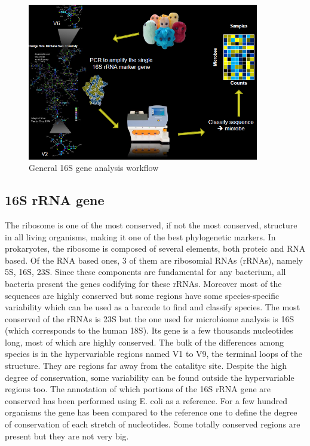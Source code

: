     \begin{figure}[H]
      \centering
      \includegraphics[width=0.9\textwidth]{general_workflow.png}
      \caption{\label{fig:general_workflow}General 16S gene analysis workflow}
    \end{figure}

  \subsection{16S rRNA gene}
    The ribosome is one of the most conserved, if not the most conserved, structure in all living organisms, making it one of the best phylogenetic markers.
    In prokaryotes, the ribosome is composed of several elements, both proteic and RNA based.
    Of the RNA based ones, $3$ of them are ribosomial RNAs (rRNAs), namely 5S, 16S, 23S.
    Since these components are fundamental for any bacterium, all bacteria present the genes codifying for these rRNAs.
    Moreover most of the sequences are highly conserved but some regions have some species-specific variability which can be used as a barcode to find and classify species.
    The most conserved of the rRNAs is 23S but the one used for microbiome analysis is 16S (which corresponds to the human 18S).
    Its gene is a few thousands nucleotides long, most of which are highly conserved.
    The bulk of the differences among species is in the hypervariable regions named V1 to V9, the terminal loops of the structure.
    They are regions far away from the catalityc site.
    Despite the high degree of conservation, some variability can be found outside the hypervariable regions too.
    The annotation of which portions of the 16S rRNA gene are conserved has been performed using E. coli as a reference.
    For a few hundred organisms the gene has been compared to the reference one to define the degree of conservation of each stretch of nucleotides.
    Some totally conserved regions  are present but they are not very big.

